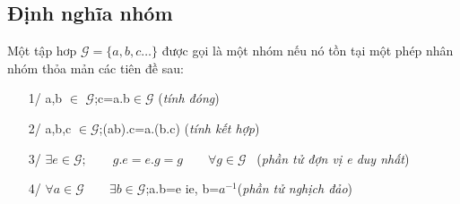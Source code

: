   \subsection{Định nghĩa nhóm}
  Một tập hơp $\mathcal{G} =\{ a,b,c\ldots \}$ được gọi là một nhóm nếu nó tồn tại một phép nhân nhóm thỏa mản các tiên đề sau:
  \begin{enumerate}
  \item[1/] a,b $\in$ $\mathcal{G}$;\qquad\qquad c=a.b$\in \mathcal{G}$ \qquad\qquad\qquad\qquad(\emph{tính đóng})
  \item[2/] a,b,c $\in \mathcal{G}$;\qquad (ab).c=a.(b.c) \qquad\qquad\qquad\qquad (\emph{tính kết hợp})
  \item[3/]$\exists e \in\mathcal{G};\qquad g.e=e.g=g \qquad\forall g\in\mathcal{G}$ \  \qquad\qquad(\emph{phần tử đợn vị e duy nhất})
  \item[4/]$\forall a\in \mathcal{G} \qquad \exists b\in\mathcal{G}$;\qquad a.b=e ie, b=$a^{-1}$\qquad\qquad (\emph{phần tử nghịch đảo})
  \end{enumerate}
